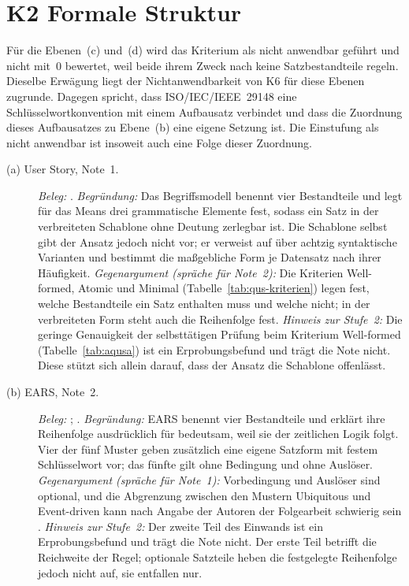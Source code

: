 \documentclass[11pt,a4paper]{report}
\begin{document}
\section{K2 Formale Struktur}
\label{sec:anhang-k2}

Für die Ebenen~(c) und~(d) wird das Kriterium als nicht anwendbar
geführt und nicht mit~0 bewertet, weil beide ihrem Zweck nach keine
Satzbestandteile regeln. Dieselbe Erwägung liegt der Nichtanwendbarkeit
von K6 für diese Ebenen zugrunde. Dagegen spricht, dass ISO/IEC/IEEE~29148
eine Schlüsselwortkonvention mit einem Aufbausatz verbindet
\cite[Abschn.~5.2.4]{iso29148} und dass die Zuordnung dieses Aufbausatzes
zu Ebene~(b) eine eigene Setzung ist. Die Einstufung als nicht
anwendbar ist insoweit auch eine Folge dieser Zuordnung.

\begin{description}
  \item[(a) User Story, Note~1.]
  \emph{Beleg:} \cite[Abschn.~2 mit Abb.~1, 2.1, 2.3, 3.2.2 und
  4.7]{lucassen2016qus}.
  \emph{Begründung:} Das Begriffsmodell benennt vier Bestandteile und
  legt für das Means drei grammatische Elemente fest, sodass ein Satz in
  der verbreiteten Schablone ohne Deutung zerlegbar ist. Die Schablone
  selbst gibt der Ansatz jedoch nicht vor; er verweist auf über achtzig
  syntaktische Varianten und bestimmt die maßgebliche Form je Datensatz
  nach ihrer Häufigkeit.
  \emph{Gegenargument (spräche für Note~2):} Die Kriterien Well-formed,
  Atomic und Minimal (Tabelle~\ref{tab:qus-kriterien}) legen fest, welche
  Bestandteile ein Satz enthalten muss und welche nicht; in der
  verbreiteten Form steht auch die Reihenfolge fest.
  \emph{Hinweis zur Stufe~2:} Die geringe Genauigkeit der selbsttätigen
  Prüfung beim Kriterium Well-formed (Tabelle~\ref{tab:aqusa}) ist ein
  Erprobungsbefund und trägt die Note nicht. Diese stützt sich allein
  darauf, dass der Ansatz die Schablone offenlässt.

  \item[(b) EARS, Note~2.]
  \emph{Beleg:} \cite[Abschn.~4.1--4.7]{mavin2009ears};
  \cite[Abschn.~EARS Templates]{mavin2010bigears}.
  \emph{Begründung:} EARS benennt vier Bestandteile und erklärt ihre
  Reihenfolge ausdrücklich für bedeutsam, weil sie der zeitlichen Logik
  folgt. Vier der fünf Muster geben zusätzlich eine eigene Satzform mit
  festem Schlüsselwort vor; das fünfte gilt ohne Bedingung und ohne
  Auslöser.
  \emph{Gegenargument (spräche für Note~1):} Vorbedingung und Auslöser
  sind optional, und die Abgrenzung zwischen den Mustern Ubiquitous und
  Event-driven kann nach Angabe der Autoren der Folgearbeit schwierig
  sein \cite[Abschn.~Lessons Learned Applying EARS]{mavin2010bigears}.
  \emph{Hinweis zur Stufe~2:} Der zweite Teil des Einwands ist ein
  Erprobungsbefund und trägt die Note nicht. Der erste Teil betrifft die
  Reichweite der Regel; optionale Satzteile heben die festgelegte
  Reihenfolge jedoch nicht auf, sie entfallen nur.


\end{description}
\end{document}
